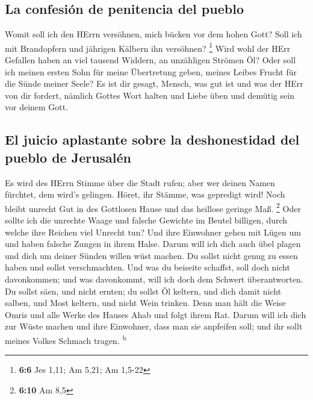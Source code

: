 \hypertarget{la-confesiuxf3n-de-penitencia-del-pueblo}{%
\subsection{La confesión de penitencia del
pueblo}\label{la-confesiuxf3n-de-penitencia-del-pueblo}}

 Womit soll ich den HErrn versöhnen, mich bücken vor dem
hohen Gott? Soll ich mit Brandopfern und jährigen Kälbern ihn versöhnen?
\footnote{\textbf{6:6} Jes 1,11; Am 5,21; Am 1,5-22}  Wird
wohl der HErr Gefallen haben an viel tausend Widdern, an unzähligen
Strömen Öl? Oder soll ich meinen ersten Sohn für meine Übertretung
geben, meines Leibes Frucht für die Sünde meiner Seele? 
Es ist dir gesagt, Mensch, was gut ist und was der HErr von dir fordert,
nämlich Gottes Wort halten und Liebe üben und demütig sein vor deinem
Gott.

\hypertarget{el-juicio-aplastante-sobre-la-deshonestidad-del-pueblo-de-jerusaluxe9n}{%
\subsection{El juicio aplastante sobre la deshonestidad del pueblo de
Jerusalén}\label{el-juicio-aplastante-sobre-la-deshonestidad-del-pueblo-de-jerusaluxe9n}}

 Es wird des HErrn Stimme über die Stadt rufen; aber wer
deinen Namen fürchtet, dem wird's gelingen. Höret, ihr Stämme, was
gepredigt wird!  Noch bleibt unrecht Gut in des Gottlosen
Hause und das heillose geringe Maß. \footnote{\textbf{6:10} Am 8,5}
 Oder sollte ich die unrechte Waage und falsche Gewichte
im Beutel billigen,  durch welche ihre Reichen viel
Unrecht tun? Und ihre Einwohner gehen mit Lügen um und haben falsche
Zungen in ihrem Halse.  Darum will ich dich auch übel
plagen und dich um deiner Sünden willen wüst machen.  Du
sollst nicht genug zu essen haben und sollst verschmachten. Und was du
beiseite schaffst, soll doch nicht davonkommen; und was davonkommt, will
ich doch dem Schwert überantworten.  Du sollst säen, und
nicht ernten; du sollst Öl keltern, und dich damit nicht salben, und
Most keltern, und nicht Wein trinken.  Denn man hält die
Weise Omris und alle Werke des Hauses Ahab und folgt ihrem Rat. Darum
will ich dich zur Wüste machen und ihre Einwohner, dass man sie
anpfeifen soll; und ihr sollt meines Volkes Schmach tragen.
\textsuperscript{b}

